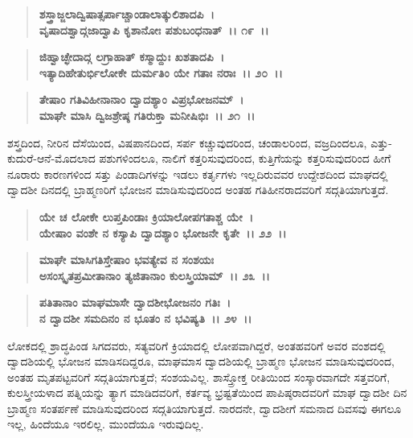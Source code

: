 \begin{verse}
\textbf{ಶಸ್ತ್ರಾಜ್ಜಲಾದ್ವಿಷಾತ್ಸರ್ಪಾಚ್ಚಾಂಡಾಲಾತ್ಕುಲಿಶಾದಪಿ~।}\\\textbf{ವೃಷಾದಶ್ವಾದ್ಗಜಾದ್ವಾಪಿ ಕೃಶಾನೋಃ ಪಶುಬಂಧನಾತ್~।। ೧೯~।। }
\end{verse}

\begin{verse}
\textbf{ಜಿಹ್ವಾಚ್ಛೇದಾದ್ಗ ಲಗ್ರಾಹಾತ್ ಕಸ್ಮಾದ್ದುಃ ಖಶತಾದಪಿ~।}\\\textbf{ಇತ್ಯಾದಿಹೇತುರ್ಭಿಲೋಕೇ ದುರ್ಮತಿಂ ಯೇ ಗತಾಃ ನರಾಃ~।। ೨೦~।। }
\end{verse}

\begin{verse}
\textbf{ತೇಷಾಂ ಗತಿವಿಹೀನಾನಾಂ ದ್ವಾದಶ್ಯಾಂ ವಿಪ್ರಭೋಜನಮ್~।}\\\textbf{ಮಾಘೇ ಮಾಸಿ ದ್ವಿಜಶ್ರೇಷ್ಠ ಗತಿರುಕ್ತಾ ಮನೀಷಿಭಿಃ~।। ೨೧~।।}
\end{verse}

ಶಸ್ತ್ರದಿಂದ, ನೀರಿನ ದೆಸೆಯಿಂದ, ವಿಷಪಾನದಿಂದ, ಸರ್ಪ ಕಚ್ಚುವುದರಿಂದ, ಚಂಡಾಲರಿಂದ, ವಜ್ರದಿಂದಲೂ, ಎತ್ತು-ಕುದುರೆ-ಆನೆ-ಮೊದಲಾದ ಪಶುಗಳಿಂದಲೂ, ನಾಲಿಗೆ ಕತ್ತರಿಸುವುದರಿಂದ, ಕುತ್ತಿಗೆಯನ್ನು ಕತ್ತರಿಸುವುದರಿಂದ ಹೀಗೆ ನೂರಾರು ಕಾರಣಗಳಿಂದ ಸತ್ತು ಪಿಂಡಾದಿಗಳನ್ನು ಇಡಲು ಕರ್ತೃಗಳು ಇಲ್ಲದಿರುವವರ ಉದ್ದೇಶದಿಂದ ಮಾಘದಲ್ಲಿ ದ್ವಾದಶೀ ದಿನದಲ್ಲಿ ಬ್ರಾಹ್ಮಣರಿಗೆ ಭೋಜನ ಮಾಡಿಸುವುದರಿಂದ ಅಂತಹ ಗತಿಹೀನರಾದವರಿಗೆ ಸದ್ಗತಿಯಾಗುತ್ತದೆ.

\begin{verse}
\textbf{ಯೇ ಚ ಲೋಕೇ ಲುಪ್ತಪಿಂಡಾಃ ಕ್ರಿಯಾಲೋಪಗತಾಶ್ಚ ಯೇ~।}\\\textbf{ಯೇಷಾಂ ವಂಶೇ ನ ಕಸ್ಯಾಪಿ ದ್ವಾದಶ್ಯಾಂ ಭೋಜನೇ ಕೃತೇ~।। ೨೨~।।} 
\end{verse}

\begin{verse}
\textbf{ಮಾಘೇ ಮಾಸಿಗತಿಸ್ತೇಷಾಂ ಭವತ್ಯೇವ ನ ಸಂಶಯಃ}\\\textbf{ಅಸಂಸ್ಕೃತಪ್ರಮೀತಾನಾಂ ತ್ಯಜಿತಾನಾಂ ಕುಲಸ್ತ್ರಿಯಾಮ್~।। ೨೩~।। }
\end{verse}

\begin{verse}
\textbf{ಪತಿತಾನಾಂ ಮಾಘಮಾಸೇ ದ್ವಾದಶೀಭೋಜನಂ ಗತಿಃ~।}\\\textbf{ನ ದ್ವಾದಶೀ ಸಮದಿನಂ ನ ಭೂತಂ ನ ಭವಿಷ್ಯತಿ~।। ೨೪~।।}
\end{verse}

ಲೋಕದಲ್ಲಿ ಶ್ರಾದ್ಧಪಿಂಡ ಸಿಗದವರು, ಸತ್ಯವರಿಗೆ ಕ್ರಿಯಾದಲ್ಲಿ ಲೋಪವಾಗಿದ್ದರೆ, ಅಂತಹವರಿಗೆ ಅವರ ವಂಶದಲ್ಲಿ ದ್ವಾದಶಿಯಲ್ಲಿ ಭೋಜನ ಮಾಡಿಸದಿದ್ದರೂ, ಮಾಘಮಾಸ ದ್ವಾದಶಿಯಲ್ಲಿ ಬ್ರಾಹ್ಮಣ ಭೋಜನ ಮಾಡಿಸುವುದರಿಂದ, ಅಂತಹ ಮೃತಪಟ್ಟವರಿಗೆ ಸದ್ಗತಿಯಾಗುತ್ತದೆ; ಸಂಶಯವಿಲ್ಲ. ಶಾಸ್ತ್ರೋಕ್ತ ರೀತಿಯಿಂದ ಸಂಸ್ಕಾರವಾಗದೇ ಸತ್ತವರಿಗೆ, ಕುಲಸ್ತ್ರೀಯಳಾದ ಪತ್ನಿಯನ್ನು ತ್ಯಾಗ ಮಾಡಿದವರಿಗೆ, ಕರ್ತವ್ಯ ಭ್ರಷ್ಟತೆಯಿಂದ ಪಾಪಿಷ್ಠರಾದವರಿಗೆ ಮಾಘ ದ್ವಾದಶೀ ದಿನ ಬ್ರಾಹ್ಮಣ ಸಂತರ್ಪಣೆ ಮಾಡಿಸುವುದರಿಂದ ಸದ್ಗತಿಯಾಗುತ್ತದೆ. ನಾರದನೇ, ದ್ವಾದಶೀಗೆ ಸಮನಾದ ದಿವಸವು ಈಗಲೂ ಇಲ್ಲ, ಹಿಂದೆಯೂ ಇರಲಿಲ್ಲ. ಮುಂದೆಯೂ ಇರುವುದಿಲ್ಲ.

